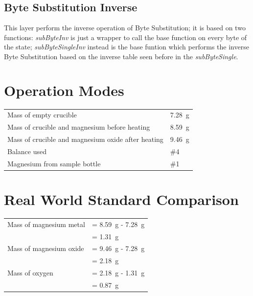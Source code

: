 \documentclass{article}
\begin{document}
\subsection{Byte Substitution Inverse}

This layer perform the inverse operation of Byte Substitution; it is based on two functions: \textit{subByteInv} is just a wrapper to call the base function on every byte of the state; \textit{subByteSingleInv} instead is the base funtion which performs the inverse Byte Substitution based on the inverse table seen before in the \textit{subByteSingle}.
 

\section{Operation Modes}

\begin{tabular}{ll}
Mass of empty crucible & \SI{7.28}{\gram}\\
Mass of crucible and magnesium before heating & \SI{8.59}{\gram}\\
Mass of crucible and magnesium oxide after heating & \SI{9.46}{\gram}\\
Balance used & \#4\\
Magnesium from sample bottle & \#1
\end{tabular}


\section{Real World Standard Comparison}

\begin{tabular}{ll}
Mass of magnesium metal & = \SI{8.59}{\gram} - \SI{7.28}{\gram}\\
& = \SI{1.31}{\gram}\\
Mass of magnesium oxide & = \SI{9.46}{\gram} - \SI{7.28}{\gram}\\
& = \SI{2.18}{\gram}\\
Mass of oxygen & = \SI{2.18}{\gram} - \SI{1.31}{\gram}\\
& = \SI{0.87}{\gram}
\end{tabular}
\end{document}
